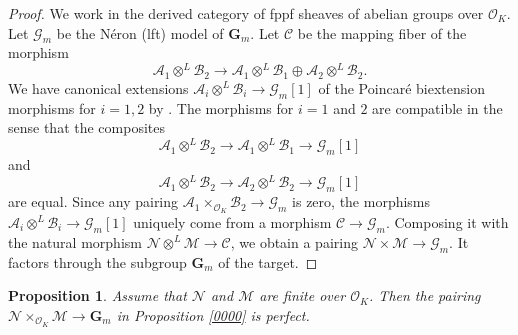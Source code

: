 \documentclass{amsart}
\newtheorem{proposition}[theorem]{Proposition}
\theoremstyle{remark}
\numberwithin{equation}{section}
\newcommand{\Order}{\mathcal{O}}
\newcommand{\tensor}{\mathbin{\otimes}}
\newcommand{\Gm}{\mathbf{G}_{m}}
\begin{document}
\begin{proof}
	We work in the derived category
	of fppf sheaves of abelian groups over $\Order_{K}$.
	Let $\mathcal{G}_{m}$ be the N\'eron (lft) model of $\Gm$.
	Let $\mathcal{C}$ be the mapping fiber of the morphism
		\[
				\mathcal{A}_{1} \tensor^{L} \mathcal{B}_{2}
			\to
					\mathcal{A}_{1} \tensor^{L} \mathcal{B}_{1}
				\oplus
					\mathcal{A}_{2} \tensor^{L} \mathcal{B}_{2}.
		\]
	We have canonical extensions
	$\mathcal{A}_{i} \tensor^{L} \mathcal{B}_{i} \to \mathcal{G}_{m}[1]$
	of the Poincar\'e biextension morphisms
	for $i = 1, 2$
	by \cite[Chapter III, Lemma C.10]{Mil06}.
	The morphisms for $i = 1$ and $2$ are compatible in the sense that the composites
		\[
				\mathcal{A}_{1} \tensor^{L} \mathcal{B}_{2}
			\to
				\mathcal{A}_{1} \tensor^{L} \mathcal{B}_{1}
			\to
				\mathcal{G}_{m}[1]
		\]
	and
		\[
				\mathcal{A}_{1} \tensor^{L} \mathcal{B}_{2}
			\to
				\mathcal{A}_{2} \tensor^{L} \mathcal{B}_{2}
			\to
				\mathcal{G}_{m}[1]
		\]
	are equal.
	Since any pairing
	$\mathcal{A}_{1} \times_{\Order_{K}} \mathcal{B}_{2} \to \mathcal{G}_{m}$
	is zero,
	the morphisms
	$\mathcal{A}_{i} \tensor^{L} \mathcal{B}_{i} \to \mathcal{G}_{m}[1]$
	uniquely come from a morphism
	$\mathcal{C} \to \mathcal{G}_{m}$.
	Composing it with the natural morphism
	$\mathcal{N} \tensor^{L} \mathcal{M} \to \mathcal{C}$,
	we obtain a pairing
	$\mathcal{N} \times \mathcal{M} \to \mathcal{G}_{m}$.
	It factors through the subgroup $\Gm$ of the target.
\end{proof}

\begin{proposition} \label{0032}
	Assume that $\mathcal{N}$ and $\mathcal{M}$ are finite over $\Order_{K}$.
	Then the pairing
	$\mathcal{N} \times_{\Order_{K}} \mathcal{M} \to \Gm$
	in Proposition \ref{0000} is perfect.
\end{proposition}
\end{document}
